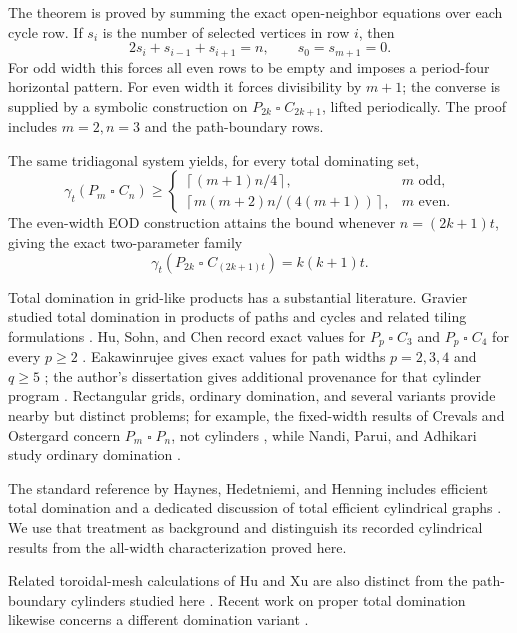 \documentclass[11pt]{article}
\theoremstyle{definition}
\newcommand{\gt}{\gamma_t}
\newcommand{\sq}{\mathbin{\square}}
\begin{document}
The theorem is proved by summing the exact open-neighbor equations over each
cycle row. If \(s_i\) is the number of selected vertices in row \(i\), then
\[
2s_i+s_{i-1}+s_{i+1}=n,\qquad s_0=s_{m+1}=0.
\]
For odd width this forces all even rows to be empty and imposes a
period-four horizontal pattern. For even width it forces divisibility by
\(m+1\); the converse is supplied by a symbolic construction on
\(P_{2k}\sq C_{2k+1}\), lifted periodically. The proof includes \(m=2,n=3\)
and the path-boundary rows.

The same tridiagonal system yields, for every total dominating set,
\[
\gt(P_m\sq C_n)\geq
\begin{cases}
\left\lceil (m+1)n/4\right\rceil,&m\text{ odd},\\[1mm]
\left\lceil m(m+2)n/(4(m+1))\right\rceil,&m\text{ even}.
\end{cases}
\]
The even-width EOD construction attains the bound whenever
\(n=(2k+1)t\), giving the exact two-parameter family
\[
\gt(P_{2k}\sq C_{(2k+1)t})=k(k+1)t.
\]

Total domination in grid-like products has a substantial literature. Gravier
studied total domination in products of paths and cycles and related tiling
formulations \cite{Gravier2002}. Hu, Sohn, and Chen record exact values for
\(P_p\sq C_3\) and \(P_p\sq C_4\) for every \(p\ge2\)
\cite{HuSohnChen2016}. Eakawinrujee gives exact values for path widths
\(p=2,3,4\) and \(q\ge5\) \cite{Eakawinrujee2022}; the author's dissertation
gives additional provenance for that cylinder program
\cite{EakawinrujeeThesis2023}.
Rectangular grids, ordinary domination, and several
variants provide nearby but distinct problems; for example, the fixed-width
results of Crevals and Ostergard concern \(P_m\sq P_n\), not cylinders
\cite{CrevalsOstergard2017}, while Nandi, Parui, and Adhikari study ordinary
domination \cite{NandiParuiAdhikari2011}.

The standard reference by Haynes, Hedetniemi, and Henning includes efficient
total domination and a dedicated discussion of total efficient cylindrical
graphs \cite{HaynesHedetniemiHenning2023}. We use that treatment as
background and distinguish its recorded cylindrical results from the
all-width characterization proved here.

Related toroidal-mesh calculations of Hu and Xu are also distinct from the
path-boundary cylinders studied here \cite{HuXu2014}. Recent work on proper
total domination likewise concerns a different domination variant
\cite{OsbornZhang2026}.
\end{document}
